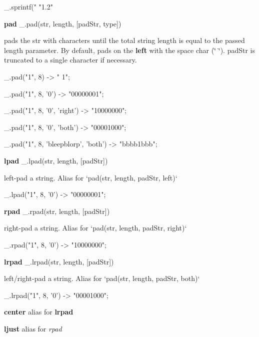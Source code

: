 \begin{DoxyCode}
\_.sprintf("%
"1.2"
\end{DoxyCode}


{\bfseries pad} \+\_\+.\+pad(str, length, \mbox{[}pad\+Str, type\mbox{]})

pads the {\ttfamily str} with characters until the total string length is equal to the passed {\ttfamily length} parameter. By default, pads on the {\bfseries left} with the space char ({\ttfamily \char`\"{} \char`\"{}}). {\ttfamily pad\+Str} is truncated to a single character if necessary.


\begin{DoxyCode}
\_.pad("1", 8)
-> "       1";

\_.pad("1", 8, '0')
-> "00000001";

\_.pad("1", 8, '0', 'right')
-> "10000000";

\_.pad("1", 8, '0', 'both')
-> "00001000";

\_.pad("1", 8, 'bleepblorp', 'both')
-> "bbbb1bbb";
\end{DoxyCode}


{\bfseries lpad} \+\_\+.\+lpad(str, length, \mbox{[}pad\+Str\mbox{]})

left-\/pad a string. Alias for `pad(str, length, pad\+Str, \textquotesingle{}left\textquotesingle{})`


\begin{DoxyCode}
\_.lpad("1", 8, '0')
-> "00000001";
\end{DoxyCode}


{\bfseries rpad} \+\_\+.\+rpad(str, length, \mbox{[}pad\+Str\mbox{]})

right-\/pad a string. Alias for `pad(str, length, pad\+Str, \textquotesingle{}right\textquotesingle{})`


\begin{DoxyCode}
\_.rpad("1", 8, '0')
-> "10000000";
\end{DoxyCode}


{\bfseries lrpad} \+\_\+.\+lrpad(str, length, \mbox{[}pad\+Str\mbox{]})

left/right-\/pad a string. Alias for `pad(str, length, pad\+Str, \textquotesingle{}both\textquotesingle{})`


\begin{DoxyCode}
\_.lrpad("1", 8, '0')
-> "00001000";
\end{DoxyCode}


{\bfseries center} alias for {\bfseries lrpad}

{\bfseries ljust} alias for {\itshape rpad}

